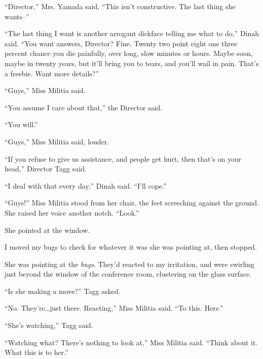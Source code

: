 ``Director,'' Mrs. Yamada said, ``This isn't constructive.  The last thing she wants--''



``The last thing I want is another arrogant dickface telling me what to do,'' Dinah said.  ``You want answers, Director?  Fine.  Twenty two point eight one three percent chance you die painfully, over long, slow minutes or hours.  Maybe soon, maybe in twenty years, but it'll bring you to tears, and you'll wail in pain.  That's a freebie.  Want more details?''



``Guys,'' Miss Militia said.



``You assume I care about that,'' the Director said.



``You will.''



``Guys,'' Miss Militia said, louder.



``If you refuse to give us assistance, and people get hurt, then that's on your head,'' Director Tagg said.



``I deal with that every day,'' Dinah said.  ``I'll cope.''



``Guys!''  Miss Militia stood from her chair, the feet screeching against the ground.  She raised her voice another notch.  ``Look.''



She pointed at the window.



I moved my bugs to check for whatever it was she was pointing at, then stopped.



She was pointing at the \emph{bugs}.  They'd reacted to my irritation, and were swirling just beyond the window of the conference room, clustering on the glass surface.



``Is she making a move?''  Tagg asked.



``No.  They're\ldots just there.  Reacting,'' Miss Militia said.  ``To this.  Here.''



``She's watching,'' Tagg said.



``Watching what?  There's nothing to look at,'' Miss Militia said.  ``Think about it.  What this is to her.''



